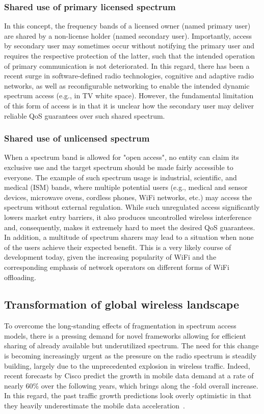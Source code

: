 \documentclass[journal]{IEEEtran}
\begin{document}
\subsubsection{Shared use of primary licensed spectrum} In this concept, the frequency bands of a licensed owner (named primary user) are shared by a non-license holder (named secondary user). Importantly, access by secondary user may sometimes occur without notifying the primary user and requires the respective protection of the latter, such that the intended operation of primary communication is not deteriorated. In this regard, there has been a recent surge in software-defined radio technologies, cognitive and adaptive radio networks, as well as reconfigurable networking to enable the intended dynamic spectrum access (e.g., in TV white space). However, the fundamental limitation of this form of access is in that it is unclear how the secondary user may deliver reliable QoS guarantees over such shared spectrum.

\subsubsection{Shared use of unlicensed spectrum} When a spectrum band is allowed for "open access", no entity can claim its exclusive use and the target spectrum should be made fairly accessible to everyone. The example of such spectrum usage is industrial, scientific, and medical (ISM) bands, where multiple potential users (e.g., medical and sensor devices, microwave ovens, cordless phones, WiFi networks, etc.) may access the spectrum without external regulation. While such unregulated access significantly lowers market entry barriers, it also produces uncontrolled wireless interference and, consequently, makes it extremely hard to meet the desired QoS guarantees. In addition, a multitude of spectrum sharers may lead to a situation when none of the users achieve their expected benefit. This is a very likely course of development today, given the increasing popularity of WiFi and the corresponding emphasis of network operators on different forms of WiFi offloading.

\subsection{Transformation of global wireless landscape}

To overcome the long-standing effects of fragmentation in spectrum access models, there is a pressing demand for novel frameworks allowing for efficient sharing of already available but underutilized spectrum. The need for this change is becoming increasingly urgent as the pressure on the radio spectrum is steadily building, largely due to the unprecedented explosion in wireless traffic. Indeed, recent forecasts by Cisco predict the growth in mobile data demand at a rate of nearly 60\% over the following  years, which brings along the -fold overall increase. In this regard, the past traffic growth predictions look overly optimistic in that they heavily underestimate the mobile data acceleration~\cite{Mue14}.
\end{document}
